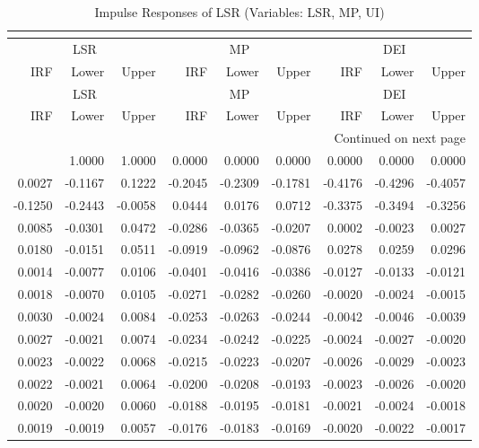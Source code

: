 \begin{longtable}{rrrrrrrrr}
\caption{Impulse Responses of LSR (Variables: LSR, MP, UI)}\\
\label{tab:lsr_irf_group1}\\
\toprule
\multicolumn{3}{c}{LSR} & \multicolumn{3}{c}{MP} & \multicolumn{3}{c}{DEI} \\
IRF & Lower & Upper & IRF & Lower & Upper & IRF & Lower & Upper \\
\midrule
\endfirsthead
\toprule
\multicolumn{3}{c}{LSR} & \multicolumn{3}{c}{MP} & \multicolumn{3}{c}{DEI} \\
IRF & Lower & Upper & IRF & Lower & Upper & IRF & Lower & Upper \\
\midrule
\endhead
\midrule
\multicolumn{9}{r}{Continued on next page} \\
\midrule
\endfoot
\bottomrule
\endlastfoot
1.0000 & 1.0000 & 1.0000 & 0.0000 & 0.0000 & 0.0000 & 0.0000 & 0.0000 & 0.0000 \\
0.0027 & -0.1167 & 0.1222 & -0.2045 & -0.2309 & -0.1781 & -0.4176 & -0.4296 & -0.4057 \\
-0.1250 & -0.2443 & -0.0058 & 0.0444 & 0.0176 & 0.0712 & -0.3375 & -0.3494 & -0.3256 \\
0.0085 & -0.0301 & 0.0472 & -0.0286 & -0.0365 & -0.0207 & 0.0002 & -0.0023 & 0.0027 \\
0.0180 & -0.0151 & 0.0511 & -0.0919 & -0.0962 & -0.0876 & 0.0278 & 0.0259 & 0.0296 \\
0.0014 & -0.0077 & 0.0106 & -0.0401 & -0.0416 & -0.0386 & -0.0127 & -0.0133 & -0.0121 \\
0.0018 & -0.0070 & 0.0105 & -0.0271 & -0.0282 & -0.0260 & -0.0020 & -0.0024 & -0.0015 \\
0.0030 & -0.0024 & 0.0084 & -0.0253 & -0.0263 & -0.0244 & -0.0042 & -0.0046 & -0.0039 \\
0.0027 & -0.0021 & 0.0074 & -0.0234 & -0.0242 & -0.0225 & -0.0024 & -0.0027 & -0.0020 \\
0.0023 & -0.0022 & 0.0068 & -0.0215 & -0.0223 & -0.0207 & -0.0026 & -0.0029 & -0.0023 \\
0.0022 & -0.0021 & 0.0064 & -0.0200 & -0.0208 & -0.0193 & -0.0023 & -0.0026 & -0.0020 \\
0.0020 & -0.0020 & 0.0060 & -0.0188 & -0.0195 & -0.0181 & -0.0021 & -0.0024 & -0.0018 \\
0.0019 & -0.0019 & 0.0057 & -0.0176 & -0.0183 & -0.0169 & -0.0020 & -0.0022 & -0.0017 \\
\end{longtable}